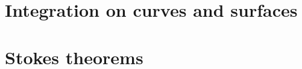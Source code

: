 \documentclass{../note}
\begin{document}
\section{Integration on curves and surfaces}

\begin{prb}
\end{prb}

\begin{prb}
\end{prb}


\section{Stokes theorems}
\begin{prb}
\end{prb}

\begin{prb}
\end{prb}

\begin{prb}
\end{prb}
\end{document}
